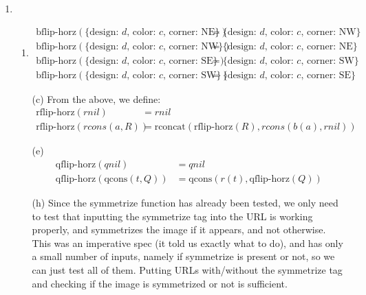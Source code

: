 \documentclass[12pt]{article}
\theoremstyle{definitionstyle}
\begin{document}
\begin{enumerate}[leftmargin=\labelsep]
        \item \begin{enumerate}
            \item \[\begin{aligned}
                \text{bflip-horz}(\{\text{design: $d$, color: $c$, corner: NE}\}) &= \{\text{design: $d$, color: $c$, corner: NW}\} \\
                \text{bflip-horz}(\{\text{design: $d$, color: $c$, corner: NW}\}) &= \{\text{design: $d$, color: $c$, corner: NE}\} \\
                \text{bflip-horz}(\{\text{design: $d$, color: $c$, corner: SE}\}) &= \{\text{design: $d$, color: $c$, corner: SW}\} \\
                \text{bflip-horz}(\{\text{design: $d$, color: $c$, corner: SW}\}) &= \{\text{design: $d$, color: $c$, corner: SE}\}
            \end{aligned}\]
            \item[(c)] From the above, we define:
            \[\begin{aligned}
                \text{rflip-horz}(rnil) &= rnil \\
                \text{rflip-horz}(rcons(a, R)) &= \text{rconcat}(\text{rflip-horz}(R), rcons(b(a), rnil))
            \end{aligned}\]

            \item[(e)]
            \[\begin{aligned}
                \text{qflip-horz}(qnil) &= qnil \\
                \text{qflip-horz}(\text{qcons}(t, Q)) &= \text{qcons}(r(t), \text{qflip-horz}(Q))
            \end{aligned}\]
            \item[(h)] Since the symmetrize function has already been tested, we only need to test that inputting the symmetrize tag into the URL is working properly, and symmetrizes the image if it appears, and not otherwise. This was an imperative spec (it told us exactly what to do), and has only a small number of inputs, namely if symmetrize is present or not, so we can just test all of them. Putting URLs with/without the symmetrize tag and checking if the image is symmetrized or not is sufficient.
        \end{enumerate}


\end{enumerate}
\end{document}
